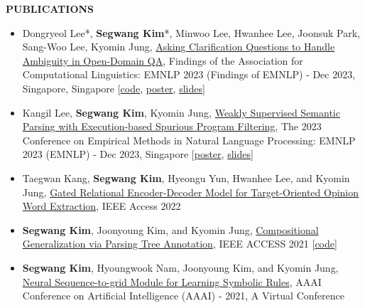 \documentclass[12pt]{article}
\begin{document}
\vspace{0.2in} %


\begin{center}
	{\noindent \bfseries PUBLICATIONS}
    \noindent\makebox[\linewidth]{\rule{0.75\paperwidth}{0.4pt}}
\end{center}

\vspace{8pt} %
\begin{itemize}
\item Dongryeol Lee*, \textbf{Segwang Kim}*, Minwoo Lee, Hwanhee Lee, Joonsuk Park, Sang-Woo Lee, Kyomin Jung, \href{https://aclanthology.org/2023.findings-emnlp.772/}{Asking Clarification Questions to Handle Ambiguity in Open-Domain QA}, Findings of the Association for Computational Linguistics: EMNLP 2023 (Findings of EMNLP) - Dec 2023, Singapore, Singapore [\href{https://github.com/dongryeollee96/askcq}{code}, \href{https://segwangkim.github.io/pdfs/poster_EMNLP23_findings.pdf}{poster}, \href{https://www.slideshare.net/pdfs/slides_EMNLP23_findings.pdf}{slides}]
\item Kangil Lee, \textbf{Segwang Kim}, Kyomin Jung, \href{https://aclanthology.org/2023.emnlp-main.425/}{Weakly Supervised Semantic Parsing with Execution-based Spurious Program Filtering}, The 2023 Conference on Empirical Methods in Natural Language Processing: EMNLP 2023 (EMNLP) - Dec 2023, Singapore [\href{https://segwangkim.github.io/pdfs/poster_EMNLP23.pdf}{poster}, \href{https://www.slideshare.net/pdfs/slides_EMNLP23.pdf}{slides}]
\item Taegwan Kang, \textbf{Segwang Kim}, Hyeongu Yun, Hwanhee Lee, and Kyomin Jung, \href{https://ieeexplore.ieee.org/document/9982601}{Gated Relational Encoder-Decoder Model for Target-Oriented Opinion Word Extraction}, IEEE Access 2022
\item \textbf{Segwang Kim}, Joonyoung Kim, and Kyomin Jung, \href{https://ieeexplore.ieee.org/document/9340248}{Compositional Generalization via Parsing Tree Annotation}, IEEE ACCESS 2021 [\href{https://github.com/SegwangKim/annotation-of-targets-using-parsing-trees}{code}]
\item \textbf{Segwang Kim}, Hyoungwook Nam, Joonyoung Kim, and Kyomin Jung, 
\href{https://ojs.aaai.org/index.php/AAAI/article/view/16994}{Neural Sequence-to-grid Module for Learning Symbolic Rules}, AAAI Conference on Artificial Intelligence (AAAI) - 2021, A Virtual Conference

\end{itemize}
\end{document}
